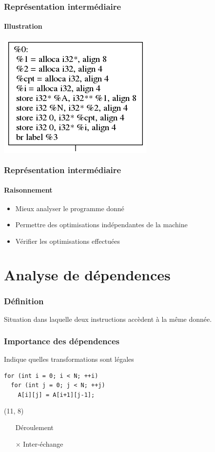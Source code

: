 \documentclass{beamer}
\begin{document}
\begin{frame}
\frametitle{Représentation intermédiaire}
\framesubtitle{Illustration}
\begin{center}
\colorbox{white}{\includegraphics[scale=0.7]{basic block.png}}
\end{center}
\end{frame}

\begin{frame}
\frametitle{Représentation intermédiaire}
\framesubtitle{Raisonnement}
\begin{itemize}
\item Mieux analyser le programme donné
\item Permettre des optimisations indépendantes de la machine
\item Vérifier les optimisations effectuées
\end{itemize}
\end{frame}

\section{Analyse de dépendences}
\begin{frame}
\frametitle{Définition}
Situation dans laquelle deux instructions accèdent à la même donnée.
\end{frame}

\begin{frame}[fragile]
\frametitle{Importance des dépendences}
Indique quelles transformations sont légales \\
\begin{lstlisting}
for (int i = 0; i < N; ++i)
  for (int j = 0; j < N; ++j)
    A[i][j] = A[i+1][j-1];
\end{lstlisting}
\begin{textblock}{6}(11, 8)
	\begin{itemize}
	\item[\checkmark] Déroulement
	\item[$\times$] Inter-échange
	\end{itemize}
\end{textblock}
\end{frame}
\end{document}

